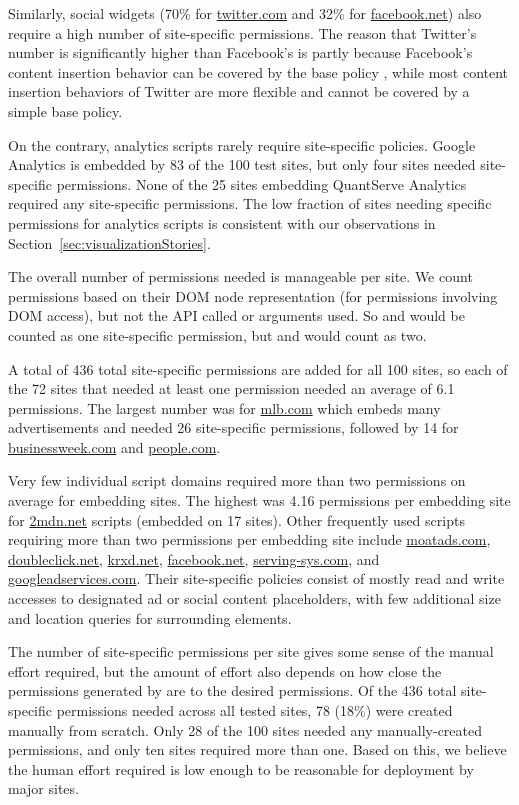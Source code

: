 Similarly, social widgets (70\% for \url{twitter.com} and 32\% for
\url{facebook.net}) also require a high number of site-specific
permissions.  The reason that Twitter's number is significantly higher
than Facebook's is partly because Facebook's content insertion behavior
can be covered by the base policy , while
most content insertion behaviors of Twitter are more flexible and cannot
be covered by a simple base policy.

On the contrary, analytics scripts rarely require site-specific
policies.  Google Analytics is embedded by 83 of the 100 test sites, but
only four sites needed site-specific permissions.  None of the
25 sites embedding QuantServe Analytics required any site-specific
permissions.  The low fraction of sites needing specific permissions for
analytics scripts is consistent with our observations in
Section~\ref{sec:visualizationStories}.

The overall number of permissions needed is manageable per site.  We
count permissions based on their DOM node representation (for
permissions involving DOM access), but not the API called or arguments
used.  So  and
 would be counted as one
site-specific permission, but  and
 would count as two.  

A total of 436 total site-specific permissions are added for all 100
sites, so each of the 72 sites that needed at least one permission
needed an average of 6.1 permissions.  The largest number was for
\url{mlb.com} which embeds many advertisements and needed 26
site-specific permissions, followed by 14 for \url{businessweek.com} and
\url{people.com}.

Very few individual script domains required more than two permissions on
average for embedding sites.  The highest was 4.16 permissions per
embedding site for \url{2mdn.net} scripts (embedded on 17 sites).  Other
frequently used scripts requiring more than two permissions per
embedding site include \url{moatads.com}, \url{doubleclick.net},
\url{krxd.net}, \url{facebook.net}, \url{serving-sys.com}, and
\url{googleadservices.com}.  Their site-specific policies consist of
mostly read and write accesses to designated ad or social content
placeholders, with few additional size and location queries for
surrounding elements.

The number of site-specific permissions per site gives some sense of the
manual effort required, but the amount of effort also depends on how
close the permissions generated by \pg are to the desired permissions.
Of the 436 total site-specific permissions needed across all tested
sites, 78 (18\%) were created manually from scratch.  Only 28 of the 100
sites needed any manually-created permissions, and only ten sites
required more than one.  Based on this, we believe the human effort
required is low enough to be reasonable for deployment by major sites.

